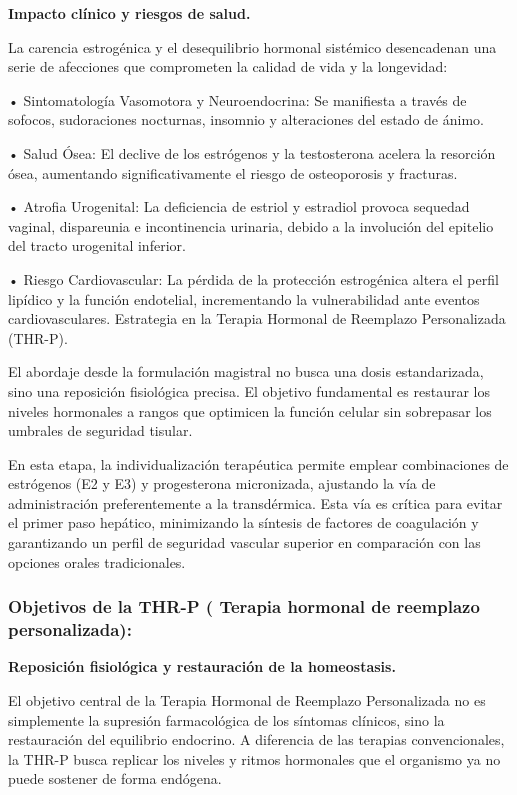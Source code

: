\documentclass[
  spanish,
]{article}
\begin{document}
\textbf{Impacto clínico y riesgos de salud.}

La carencia estrogénica y el desequilibrio hormonal sistémico desencadenan una serie de afecciones que comprometen la calidad de vida y la longevidad:

• Sintomatología Vasomotora y Neuroendocrina: Se manifiesta a través de sofocos, sudoraciones nocturnas, insomnio y alteraciones del estado de ánimo.

• Salud Ósea: El declive de los estrógenos y la testosterona acelera la resorción ósea, aumentando significativamente el riesgo de osteoporosis y fracturas.

• Atrofia Urogenital: La deficiencia de estriol y estradiol provoca sequedad vaginal, dispareunia e incontinencia urinaria, debido a la involución del epitelio del tracto urogenital inferior.

• Riesgo Cardiovascular: La pérdida de la protección estrogénica altera el perfil lipídico y la función endotelial, incrementando la vulnerabilidad ante eventos cardiovasculares.
Estrategia en la Terapia Hormonal de Reemplazo Personalizada (THR-P).

El abordaje desde la formulación magistral no busca una dosis estandarizada, sino una reposición fisiológica precisa. El objetivo fundamental es restaurar los niveles hormonales a rangos que optimicen la función celular sin sobrepasar los umbrales de seguridad tisular.

En esta etapa, la individualización terapéutica permite emplear combinaciones de estrógenos (E2 y E3) y progesterona micronizada, ajustando la vía de administración preferentemente a la transdérmica. Esta vía es crítica para evitar el primer paso hepático, minimizando la síntesis de factores de coagulación y garantizando un perfil de seguridad vascular superior en comparación con las opciones orales tradicionales.

\subsubsection{Objetivos de la THR-P ( Terapia hormonal de reemplazo personalizada):}\label{objetivos-de-la-thr-p-terapia-hormonal-de-reemplazo-personalizada}

\textbf{Reposición fisiológica y restauración de la homeostasis.}

El objetivo central de la Terapia Hormonal de Reemplazo Personalizada no es simplemente la supresión farmacológica de los síntomas clínicos, sino la restauración del equilibrio endocrino. A diferencia de las terapias convencionales, la THR-P busca replicar los niveles y ritmos hormonales que el organismo ya no puede sostener de forma endógena.
\end{document}
